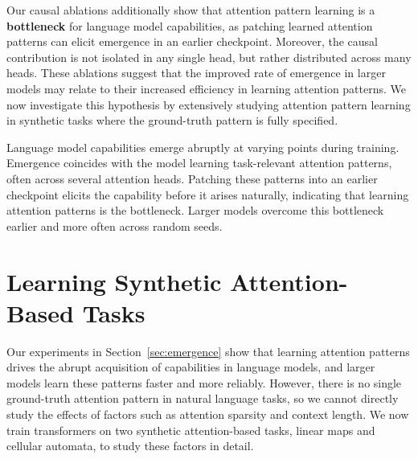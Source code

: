 \documentclass{article}
\newcommand{\xxcomment}[4]{}
\newcommand{\vatsal}[1]{}
\newcommand{\xxcomment}[4]{\textcolor{#1}{[$^{\textsc{#2}}_{\textsc{#3}}$ #4]}}
\newcommand{\vatsal}[1]{\xxcomment{pinkypink}{V}{B}{#1}}
\begin{document}
Our causal ablations additionally show that attention pattern learning is a \textbf{bottleneck} for language model capabilities, as patching learned attention patterns can elicit emergence in an earlier checkpoint.
Moreover, the causal contribution is not isolated in any single head, but rather distributed across many heads.
These ablations suggest that the improved rate of emergence in larger models may relate to their increased efficiency in learning attention patterns.
We now investigate this hypothesis by extensively studying attention pattern learning in synthetic tasks where the ground-truth pattern is fully specified.

\begin{takeaway}
Language model capabilities emerge abruptly at varying points during training. Emergence coincides with the model learning task-relevant attention patterns, often across several attention heads. Patching these patterns into an earlier checkpoint elicits the capability before it arises naturally, indicating that learning attention patterns is the bottleneck. Larger models overcome this bottleneck earlier and more often across random seeds.
\end{takeaway}


\section{Learning Synthetic Attention-Based Tasks}
\label{sec:synthetic}

Our experiments in Section~\ref{sec:emergence} show that learning attention patterns drives the abrupt acquisition of capabilities in language models, and larger models learn these patterns faster and more reliably. However, there is no single ground-truth attention pattern in natural language tasks, so we cannot directly study the effects of factors such as attention sparsity and context length. We now train transformers on two synthetic attention-based tasks, linear maps and cellular automata, to study these factors in detail.
\end{document}

